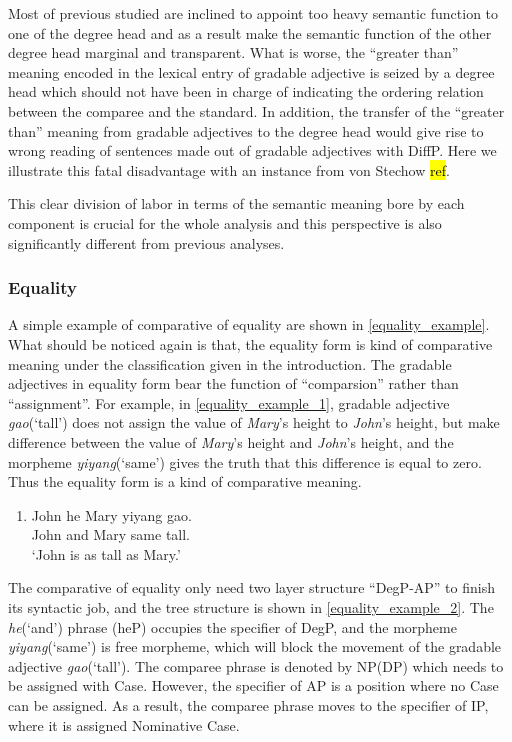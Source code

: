 \documentclass{ctexart}
\begin{document}
Most of  previous studied are inclined to appoint too heavy semantic function to one of the degree head and as a result make the semantic function of the other degree head marginal and transparent. What is worse, the ``greater than'' meaning encoded in the lexical entry of gradable adjective is seized by a degree head which should not have been in charge of indicating the ordering relation between the comparee and the standard. In addition, the transfer of the ``greater than'' meaning from gradable adjectives to the degree head would give rise to  wrong reading of sentences made out of gradable adjectives with DiffP. Here we illustrate this fatal disadvantage with an instance from von Stechow \hl{ref}.

This clear division of labor in terms of the semantic meaning bore by each component is crucial for the whole analysis and this perspective is also significantly different from previous analyses.

\subsubsection{Equality}

A simple example of comparative of equality are shown in \ref{equality_example}. What should be noticed again is that, the equality form is kind of comparative meaning under the classification given in the introduction. The gradable adjectives in equality form bear the function of ``comparsion'' rather than ``assignment''. For example, in \ref{equality_example_1}, gradable adjective \textit{gao}(`tall') does not assign the value of \textit{Mary}'s height to \textit{John}'s height, but make difference between the value of \textit{Mary}'s height and \textit{John}'s height, and the morpheme \textit{yiyang}(`same') gives the truth that this difference is equal to zero. Thus the equality form is a kind of comparative meaning.

\begin{enumerate}
    \item \label{equality_example_1}
    John he Mary yiyang gao. \\
    John and Mary same tall. \\
    `John is as tall as Mary.'
\end{enumerate}

The comparative of equality only need two layer structure ``DegP-AP'' to finish its syntactic job, and the tree structure is shown in \ref{equality_example_2}. The \textit{he}(`and') phrase (heP) occupies the specifier of DegP, and the morpheme \textit{yiyang}(`same') is free morpheme, which will block the movement of the gradable adjective \textit{gao}(`tall'). The comparee phrase is denoted by NP(DP) which needs to be assigned with Case. However, the specifier of AP is a position where no Case can be assigned. As a result, the comparee phrase moves to the specifier of IP, where it is assigned Nominative Case.
\end{document}
